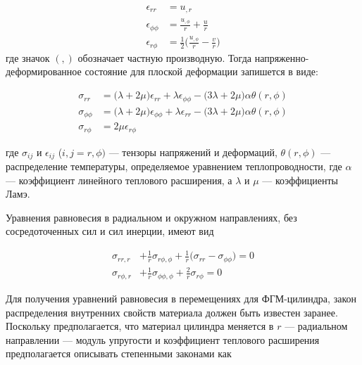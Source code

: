 \begin{equation}
	\label{eq:ch2:equation1}
	\begin{split}
		\epsilon_{rr} & = u_{,r}\\
		\epsilon_{\phi\phi} &= \frac{u_{,\phi}}{r} + \frac{u}{r}\\
		\epsilon_{r \phi} &= \frac{1}{2} \big(\frac{u_{,\phi}}{r} - \frac{v}{r} \big)
	\end{split}
\end{equation}
где значок \((,)\) обозначает частную производную. Тогда напряженно-деформированное состояние для плоской деформации запишется в виде:

\begin{equation}
	\label{eq:ch2:equation2}
	\begin{split}
		\sigma_{rr} &= \big(\lambda + 2 \mu \big) \epsilon_{rr} + \lambda \epsilon_{\phi\phi} - \big(3 \lambda +2 \mu \big) \alpha \theta (r, \phi)\\
		\sigma_{\phi\phi} &= \big(\lambda + 2 \mu \big) \epsilon_{\phi \phi} + \lambda \epsilon_{rr} - \big(3 \lambda +2 \mu \big) \alpha \theta (r, \phi)\\
		\sigma_{r \phi} &= 2\mu \epsilon_{r \phi}
	\end{split}
\end{equation}

где \(\sigma_{ij}\) и \(\epsilon_{ij}\) (\(i,j = r,\phi)\) --- тензоры напряжений и деформаций, \(\theta (r, \phi) \) --- распределение температуры, определяемое уравнением теплопроводности, где \(\alpha \) --- коэффициент линейного теплового расширения, а \( \lambda \) и \(\mu \) --- коэффициенты Ламэ.

Уравнения равновесия в радиальном и окружном направлениях, без сосредоточенных сил и сил инерции, имеют вид


\begin{equation}
	\label{eq:ch2:equation3}
	\begin{split}
		\sigma_{rr,r} &+ \frac{1}{r} \sigma_{r \phi, \phi} + \frac{1}{r} \big ( \sigma_{rr} - \sigma_{\phi\phi}\big ) = 0 \\
		\sigma_{r \phi, r} &+ \frac{1}{r} \sigma_{\phi \phi, \phi} + \frac{2}{r} \sigma_{r \phi} = 0
	\end{split}
\end{equation}


Для получения уравнений равновесия в перемещениях
для ФГМ-цилиндра, закон распределения внутренних свойств материала должен быть известен заранее. Поскольку предполагается, что материал цилиндра меняется в \(r\) --- радиальном направлении --- модуль упругости и коэффициент теплового расширения предполагается описывать степенными законами как

